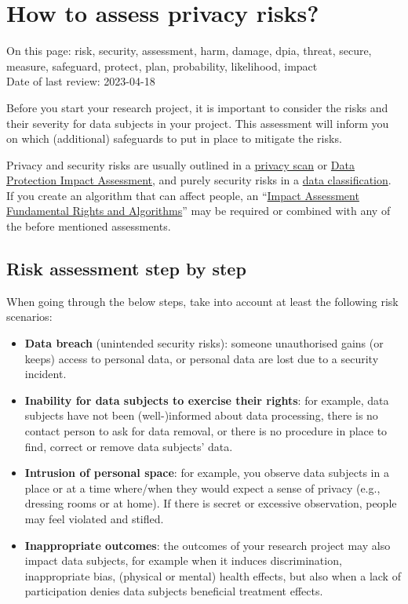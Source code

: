 \documentclass[
]{book}
\providecommand{\tightlist}{%
  \setlength{\itemsep}{0pt}\setlength{\parskip}{0pt}}
\begin{document}
\hypertarget{risk-assessment-how}{%
\section{How to assess privacy risks?}\label{risk-assessment-how}}

On this page: risk, security, assessment, harm, damage, dpia, threat, secure,
measure, safeguard, protect, plan, probability, likelihood, impact\\
Date of last review: 2023-04-18

Before you start your research project, it is important to consider the risks
and their severity for data subjects in your project. This assessment will
inform you on which (additional) safeguards to put in place to mitigate the
risks.

Privacy and security risks are usually outlined in a
\protect\hyperlink{privacy-scan}{privacy scan} or \protect\hyperlink{dpia}{Data Protection Impact Assessment}, and
purely security risks in a \protect\hyperlink{data-classification}{data classification}. If you
create an algorithm that can affect people, an
``\href{https://dspace.library.uu.nl/handle/1874/420552}{Impact Assessment Fundamental Rights and Algorithms}''
may be required or combined with any of the before mentioned assessments.

\hypertarget{risk-assessment-steps}{%
\subsection{Risk assessment step by step}\label{risk-assessment-steps}}

When going through the below steps, take into account at least the following
risk scenarios:

\begin{itemize}
\tightlist
\item
  \textbf{Data breach} (unintended security risks): someone unauthorised gains (or
  keeps) access to personal data, or personal data are lost due to a security
  incident.
\item
  \textbf{Inability for data subjects to exercise their rights}: for example, data
  subjects have not been (well-)informed about data processing, there is no
  contact person to ask for data removal, or there is no procedure in place to
  find, correct or remove data subjects' data.
\item
  \textbf{Intrusion of personal space}: for example, you observe data subjects in a
  place or at a time where/when they would expect a sense of privacy (e.g.,
  dressing rooms or at home). If there is secret or excessive observation, people
  may feel violated and stifled.
\item
  \textbf{Inappropriate outcomes}: the outcomes of your research project may also
  impact data subjects, for example when it induces discrimination, inappropriate
  bias, (physical or mental) health effects, but also when a lack of participation
  denies data subjects beneficial treatment effects.
\end{itemize}
\end{document}
